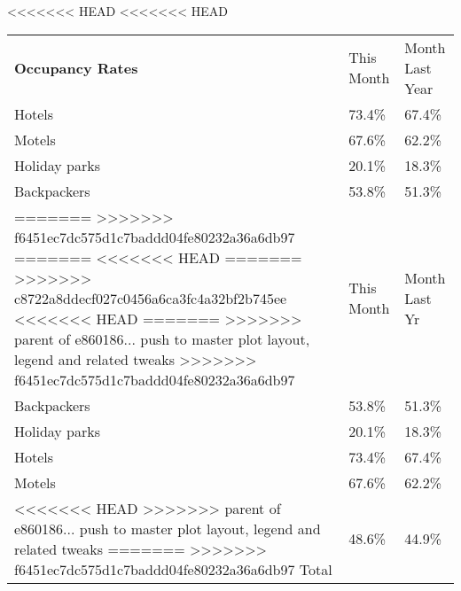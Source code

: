 <<<<<<< HEAD
<<<<<<< HEAD
\begin{tabular}[t]{p{4.5cm}>{\hfill}p{1.3cm}>{\hfill}p{1.7cm}}
 \textbf{Occupancy Rates} & This Month & Month Last Year \\ 
 Hotels & 73.4\% & 67.4\% \\ 
  Motels & 67.6\% & 62.2\% \\ 
  Holiday parks & 20.1\% & 18.3\% \\ 
  Backpackers & 53.8\% & 51.3\% \\ 
=======
>>>>>>> f6451ec7dc575d1c7baddd04fe80232a36a6db97
=======
<<<<<<< HEAD
=======
>>>>>>> c8722a8ddecf027c0456a6ca3fc4a32bf2b745ee
<<<<<<< HEAD
=======
>>>>>>> parent of e860186... push to master plot layout, legend and related tweaks
>>>>>>> f6451ec7dc575d1c7baddd04fe80232a36a6db97
\begin{tabular}[t]{p{4.8cm}>{\hfill}p{1.3cm}>{\hfill}p{1.4cm}}
 \textbf{Occupancy Rates} & This Month & Month Last Yr \\ 
 Backpackers & 53.8\% & 51.3\% \\ 
  Holiday parks & 20.1\% & 18.3\% \\ 
  Hotels & 73.4\% & 67.4\% \\ 
  Motels & 67.6\% & 62.2\% \\ 
<<<<<<< HEAD
>>>>>>> parent of e860186... push to master plot layout, legend and related tweaks
=======
>>>>>>> f6451ec7dc575d1c7baddd04fe80232a36a6db97
  Total & 48.6\% & 44.9\% \\ 
  \end{tabular}
